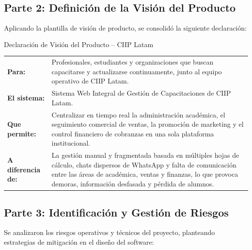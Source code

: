 \documentclass[11pt,a4paper]{article}
\begin{document}
\subsection{Parte 2: Definición de la Visión del Producto}
Aplicando la plantilla de visión de producto, se consolidó la siguiente declaración:

\begin{visionbox}{Declaración de Visión del Producto -- CIIP Latam}
\renewcommand{\arraystretch}{1.35}
\begin{tabularx}{\linewidth}{@{}p{3.2cm}X@{}}
    \textbf{Para:} & Profesionales, estudiantes y organizaciones que buscan capacitarse y actualizarse continuamente, junto al equipo operativo de CIIP Latam. \\[0.2cm]
    \textbf{El sistema:} & Sistema Web Integral de Gestión de Capacitaciones de CIIP Latam. \\[0.2cm]
    \textbf{Que permite:} & Centralizar en tiempo real la administración académica, el seguimiento comercial de ventas, la promoción de marketing y el control financiero de cobranzas en una sola plataforma institucional. \\[0.2cm]
    \textbf{A diferencia de:} & La gestión manual y fragmentada basada en múltiples hojas de cálculo, chats dispersos de WhatsApp y falta de comunicación entre las áreas de académica, ventas y finanzas, lo que provoca demoras, información desfasada y pérdida de alumnos. \\
\end{tabularx}
\end{visionbox}

\subsection{Parte 3: Identificación y Gestión de Riesgos}
Se analizaron los riesgos operativos y técnicos del proyecto, planteando estrategias de mitigación en el diseño del software:
\end{document}

